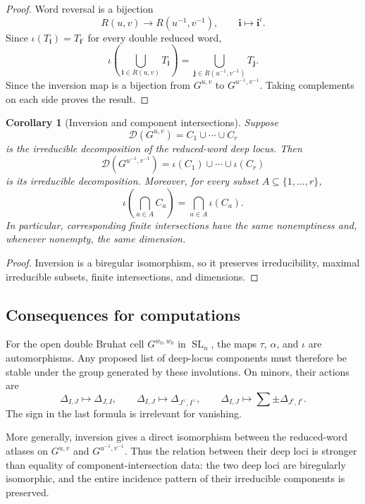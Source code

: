 \documentclass[12pt]{amsart}
\newcommand{\SL}{\operatorname{SL}}
\newcommand{\bi}{\mathbf i}
\newcommand{\cD}{\mathcal D}
\theoremstyle{plain}
\newtheorem{corollary}[theorem]{Corollary}
\theoremstyle{definition}
\theoremstyle{remark}
\begin{document}
\begin{proof}
Word reversal is a bijection
\[
   R(u,v)\longrightarrow R(u^{-1},v^{-1}),
   \qquad
   \bi\longmapsto\bi^\iota.
\]
Since $\iota(T_{\bi})=T_{\bi^\iota}$ for every double reduced word,
\[
   \iota\left(
      \bigcup_{\bi\in R(u,v)}T_{\bi}
   \right)
   =
   \bigcup_{\mathbf j\in R(u^{-1},v^{-1})}T_{\mathbf j}.
\]
Since the inversion map is a bijection from $G^{u,v}$ to $G^{u^{-1},v^{-1}}$.  Taking complements on each side proves the result.
\end{proof}

\begin{corollary}[Inversion and component intersections]
\label{cor:inversion_components}
Suppose
\[
   \cD(G^{u,v})=C_1\cup\cdots\cup C_r
\]
is the irreducible decomposition of the reduced-word deep locus.  Then
\[
   \cD(G^{u^{-1},v^{-1}})
   =\iota(C_1)\cup\cdots\cup\iota(C_r)
\]
is its irreducible decomposition.  Moreover, for every subset $A\subseteq\{1,\ldots,r\}$,
\[
   \iota\left(\bigcap_{a\in A}C_a\right)
   =\bigcap_{a\in A}\iota(C_a).
\]
In particular, corresponding finite intersections have the same nonemptiness and, whenever nonempty, the same dimension.
\end{corollary}

\begin{proof}
Inversion is a biregular isomorphism, so it preserves irreducibility, maximal irreducible subsets, finite intersections, and dimensions.
\end{proof}

\subsection{Consequences for computations}

For the open double Bruhat cell $G^{w_0,w_0}$ in $\SL_n$, the maps $\tau$, $\alpha$, and $\iota$ are automorphisms.  Any proposed list of deep-locus components must therefore be stable under the group generated by these involutions.  On minors, their actions are
\[
   \Delta_{I,J}\longmapsto \Delta_{J,I},
   \qquad
   \Delta_{I,J}\longmapsto \Delta_{J^\vee,I^\vee},
   \qquad
   \Delta_{I,J}\longmapsto
   \sum \pm\Delta_{J^c,I^c}.
\]
The sign in the last formula is irrelevant for vanishing.

More generally, inversion gives a direct isomorphism between the reduced-word atlases on $G^{u,v}$ and $G^{u^{-1},v^{-1}}$.  Thus the relation between their deep loci is stronger than equality of component-intersection data: the two deep loci are biregularly isomorphic, and the entire incidence pattern of their irreducible components is preserved.
\end{document}

